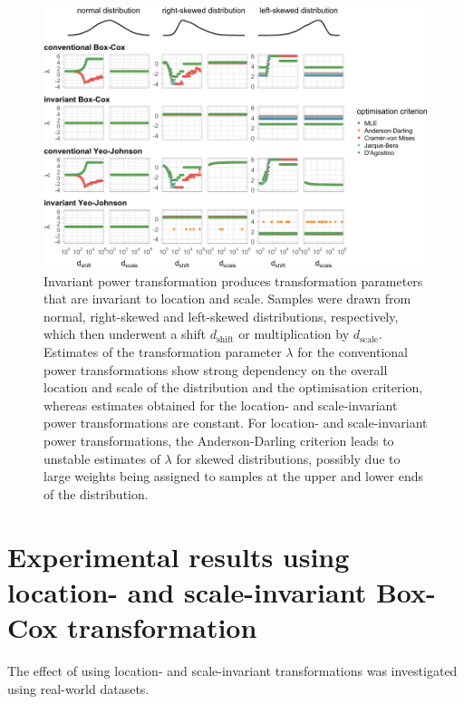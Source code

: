 \documentclass[preprint,12pt,authoryear]{elsarticle}
\begin{document}
\begin{figure}

{\centering \includegraphics[width=1\linewidth]{figure_appendix_1} 

}

\caption{Invariant power transformation produces transformation parameters that are invariant to location and scale. Samples were drawn from normal, right-skewed and left-skewed distributions, respectively, which then underwent a shift $d_{\text{shift}}$ or multiplication by $d_{\text{scale}}$. Estimates of the transformation parameter $\lambda$ for the conventional power transformations show strong dependency on the overall location and scale of the distribution and the optimisation criterion, whereas estimates obtained for the location- and scale-invariant power transformations are constant. For location- and scale-invariant power transformations, the Anderson-Darling criterion leads to unstable estimates of $\lambda$ for skewed distributions, possibly due to large weights being assigned to samples at the upper and lower ends of the distribution.}\label{fig:shifted-distributions-appendix}
\end{figure}

\section{Experimental results using location- and scale-invariant Box-Cox transformation}
\label{appendix-d-experimental-results-using-location--and-scale-invariant-box-cox-transformation}

The effect of using location- and scale-invariant transformations was
investigated using real-world datasets.
\end{document}
